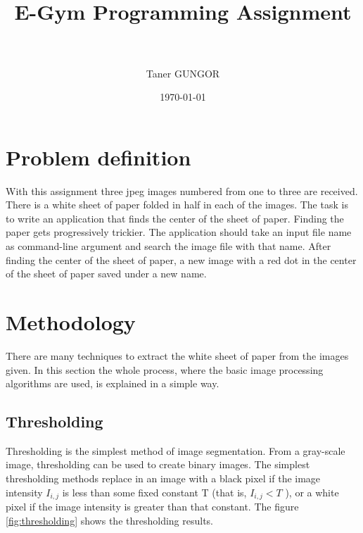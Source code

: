 \documentclass[paper=a4, fontsize=10pt]{scrartcl} %
\title{	
\normalfont \normalsize 
\horrule{0.5pt} \\[0.4cm] %
\huge E-Gym Programming Assignment \\ %
\horrule{2pt} \\[2.9cm] %
}
\author{Taner GUNGOR} %
\date{\normalsize\today} %
\numberwithin{equation}{section} %
\numberwithin{figure}{section} %
\begin{document}
\maketitle %


\section{Problem definition}

With this assignment three jpeg images numbered from one to three are received. There is a white sheet of paper folded in half in each of the images. The task is to write an application that finds the center of the sheet of paper. Finding the paper gets progressively trickier. The application should take an input file name as command-line argument and search the image file with that name. After finding the center of the sheet of paper, a new image with a red dot in the center of the sheet of paper saved under a new name.


\section{Methodology}

There are many techniques to extract the white sheet of paper from the images given. In this section the whole process, where the basic image processing algorithms are used, is explained in a simple way.
 
\subsection{Thresholding}

Thresholding is the simplest method of image segmentation. From a gray-scale image, thresholding can be used to create binary images. The simplest thresholding methods replace in an image with a black pixel if the image intensity $I_{i, j}$ is less than some fixed constant T (that is, $I_{i, j} < T$ ), or a white pixel if the image intensity is greater than that constant. The figure \ref{fig:thresholding} shows the thresholding results.
\end{document}
